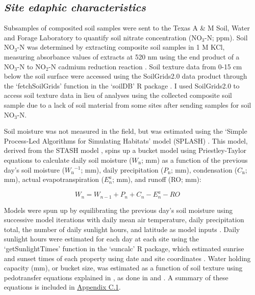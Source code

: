 \subsection{\textit{Site edaphic characteristics}}
\noindent Subsamples of composited soil samples were sent to the Texas A \& M Soil, Water and Forage Laboratory to quantify soil nitrate concentration (NO$_3$-N; ppm). Soil NO$_{3}$-N was determined by extracting composite soil samples in 1 M KCl, measuring absorbance values of extracts at 520 nm using the end product of a NO$_{3}$-N to NO$_{2}$-N cadmium reduction reaction . Soil texture data from 0-15 cm below the soil surface were accessed using the SoilGrids2.0 data product  through the ‘fetchSoilGrids’ function in the ‘soilDB’ R package . I used SoilGrids2.0 to access soil texture data in lieu of analyses using the collected composite soil sample due to a lack of soil material from some sites after sending samples for soil NO$_{3}$-N.

Soil moisture was not measured in the field, but was estimated using the ‘Simple Process-Led Algorithms for Simulating Habitats’ model (SPLASH) . This model, derived from the STASH model , spins up a bucket model using Priestley-Taylor equations  to calculate daily soil moisture ($W_\mathrm{n}$; mm) as a function of the previous day’s soil moisture ($W_\mathrm{n}{}^{-1}$; mm), daily precipitation ($P_\mathrm{n}$; mm), condensation ($C_\mathrm{n}$; mm), actual evapotranspiration ($E_{n}^a$; mm), and runoff (RO; mm):

\begin{equation}
    \label{eq_4.7}
    W_n = W_{n-1} + P_n + C_n - E_{n}^{a} - RO
\end{equation}

\noindent Models were spun up by equilibrating the previous day's soil moisture using successive model iterations with daily mean air temperature, daily precipitation total, the number of daily sunlight hours, and latitude as model inputs . Daily sunlight hours were estimated for each day at each site using the ‘getSunlightTimes’ function in the ‘suncalc’ R package, which estimated sunrise and sunset times of each property using date and site coordinates . Water holding capacity (mm), or bucket size, was estimated as a function of soil texture using pedotransfer equations explained in , as done in  and . A summary of these equations is included in \hyperref[appendix.c1]{Appendix C.1}.


